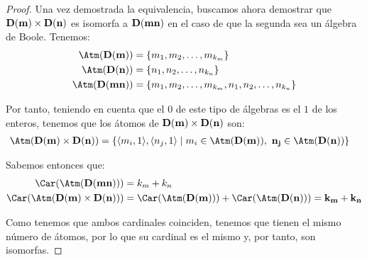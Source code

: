 \begin{ejercicio}
\begin{proof}
        Una vez demostrada la equivalencia, buscamos ahora demostrar que $\bf{D}(m)\times \bf{D}(n)$ es isomorfa a $\bf{D}(mn)$ en el caso de que la segunda sea un álgebra de Boole.
        Tenemos:
        \begin{align*}
            \Atm(\bf{D}(m)) &= \{m_1,m_2,\ldots,m_{k_m}\} \\
            \Atm(\bf{D}(n)) &= \{n_1,n_2,\ldots,n_{k_n}\} \\
            \Atm(\bf{D}(mn)) &= \{m_1,m_2,\ldots,m_{k_m},n_1,n_2,\ldots,n_{k_n}\}
        \end{align*}

        Por tanto, teniendo en cuenta que el $0$ de este tipo de álgebras es el $1$ de los enteros, tenemos que los átomos de $\bf{D}(m)\times \bf{D}(n)$ son:
        \begin{align*}
            \Atm(\bf{D}(m)\times \bf{D}(n)) &= \left\{\langle m_i,1\rangle, \langle n_j,1\rangle\mid m_i\in \Atm(\bf{D}(m)),~n_j\in \Atm(\bf{D}(n))\right\}
        \end{align*}

        Sabemos entonces que:
        \begin{align*}
            \Car(\Atm(\bf{D}(mn))) &= k_m + k_n\\
            \Car(\Atm(\bf{D}(m)\times \bf{D}(n))) &= \Car(\Atm(\bf{D}(m))) + \Car(\Atm(\bf{D}(n))) = k_m + k_n
        \end{align*}
        
        Como tenemos que ambos cardinales coinciden, tenemos que tienen el mismo número de átomos, por lo que su cardinal es el mismo y, por tanto, son isomorfas.
    \end{proof}
\end{ejercicio}


